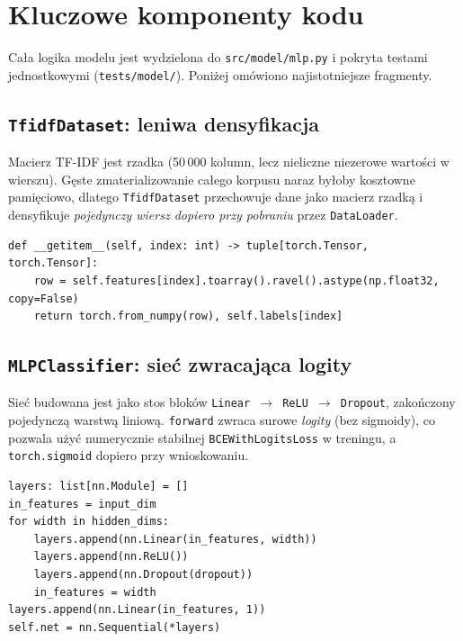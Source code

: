 \section{Kluczowe komponenty kodu}
\label{sec:kod}

Cała logika modelu jest wydzielona do \texttt{src/model/mlp.py} i pokryta testami
jednostkowymi (\texttt{tests/model/}). Poniżej omówiono najistotniejsze fragmenty.

\subsection{\texttt{TfidfDataset}: leniwa densyfikacja}

Macierz TF-IDF jest rzadka (50\,000 kolumn, lecz nieliczne niezerowe wartości w
wierszu). Gęste zmaterializowanie całego korpusu naraz byłoby kosztowne pamięciowo,
dlatego \texttt{TfidfDataset} przechowuje dane jako macierz rzadką i densyfikuje
\emph{pojedynczy wiersz dopiero przy pobraniu} przez \texttt{DataLoader}.

\begin{lstlisting}[caption={Leniwa densyfikacja wiersza w \texttt{TfidfDataset}.}]
def __getitem__(self, index: int) -> tuple[torch.Tensor, torch.Tensor]:
    row = self.features[index].toarray().ravel().astype(np.float32, copy=False)
    return torch.from_numpy(row), self.labels[index]
\end{lstlisting}

\subsection{\texttt{MLPClassifier}: sieć zwracająca logity}

Sieć budowana jest jako stos bloków \texttt{Linear $\to$ ReLU $\to$ Dropout},
zakończony pojedynczą warstwą liniową. \texttt{forward} zwraca surowe \emph{logity}
(bez sigmoidy), co pozwala użyć numerycznie stabilnej \texttt{BCEWithLogitsLoss}
w treningu, a \texttt{torch.sigmoid} dopiero przy wnioskowaniu.

\begin{lstlisting}[caption={Konstrukcja warstw \texttt{MLPClassifier}.}]
layers: list[nn.Module] = []
in_features = input_dim
for width in hidden_dims:
    layers.append(nn.Linear(in_features, width))
    layers.append(nn.ReLU())
    layers.append(nn.Dropout(dropout))
    in_features = width
layers.append(nn.Linear(in_features, 1))
self.net = nn.Sequential(*layers)
\end{lstlisting}

